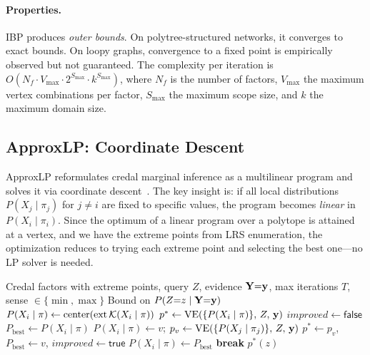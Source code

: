 \documentclass{article}
\begin{document}
\paragraph{Properties.} IBP produces \emph{outer bounds}. On polytree-structured networks, it converges to exact bounds. On loopy graphs, convergence to a fixed point is empirically observed but not guaranteed. The complexity per iteration is $O(N_f \cdot V_{\max} \cdot 2^{S_{\max}} \cdot k^{S_{\max}})$, where $N_f$ is the number of factors, $V_{\max}$ the maximum vertex combinations per factor, $S_{\max}$ the maximum scope size, and $k$ the maximum domain size.


\subsection{ApproxLP: Coordinate Descent}
\label{sec-approxlp}

ApproxLP reformulates credal marginal inference as a multilinear program and solves it via coordinate descent~\cite{antonucci2013approximate,antonucci2015finite}. The key insight is: if all local distributions $P(X_j \mid \pi_j)$ for $j \neq i$ are fixed to specific values, the program becomes \emph{linear} in $P(X_i \mid \pi_i)$. Since the optimum of a linear program over a polytope is attained at a vertex, and we have the extreme points from LRS enumeration, the optimization reduces to trying each extreme point and selecting the best one---no LP solver is needed.

\begin{algorithm}[t]
\caption{ApproxLP: Coordinate Descent over Extreme Points}
\label{alg:approxlp}
\begin{algorithmic}[1]
\Require Credal factors with extreme points, query $Z$, evidence $\mathbf{Y}{=}\mathbf{y}$,
         max iterations $T$, sense $\in \{\min, \max\}$
\Ensure Bound on $P(Z{=}z \mid \mathbf{Y}{=}\mathbf{y})$
\Statex
{}
  \State $P(X_i \mid \pi) \gets \text{center}(\mathrm{ext}\,\mathcal{K}(X_i \mid \pi))$
\EndFor
\State $p^* \gets \mathrm{VE}(\{P(X_i \mid \pi)\},\, Z,\, \mathbf{y})$
\Statex
{}
  \State $\mathit{improved} \gets \mathsf{false}$
      \State $P_{\mathrm{best}} \gets P(X_i \mid \pi)$
        \State $P(X_i \mid \pi) \gets v$;
        $p_v \gets \mathrm{VE}(\{P(X_j \mid \pi_j)\},\, Z,\, \mathbf{y})$
          \State $p^* \gets p_v$, \; $P_{\mathrm{best}} \gets v$, \; $\mathit{improved} \gets \mathsf{true}$
        \EndIf
      \EndFor
      \State $P(X_i \mid \pi) \gets P_{\mathrm{best}}$
  \EndFor
   \textbf{break} \EndIf
\EndFor
\State \Return $p^*(z)$
\end{algorithmic}
\end{algorithm}
\end{document}
